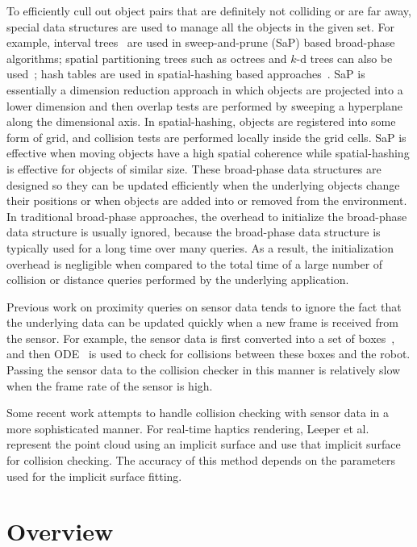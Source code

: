 To efficiently cull out object pairs that are definitely not colliding
or are far away, special data structures are used to manage all
the objects in the given set. For example, interval
trees~\cite{Tracy:2009:ELS} are used in sweep-and-prune (SaP) based broad-phase algorithms; spatial partitioning trees such as octrees and $k$-d
trees can also be used~\cite{Bandi:1995}; hash tables are used in
spatial-hashing based approaches~\cite{Eric2004book}.  SaP is essentially a dimension reduction
approach in which objects are projected into a lower dimension
and then overlap tests are performed by sweeping a hyperplane along the dimensional axis.
In spatial-hashing, objects are registered into some form of grid, and collision tests are performed
locally inside the grid cells. SaP is effective when moving objects have
a high spatial coherence while spatial-hashing is effective for objects of similar size.
These broad-phase data structures are designed so they can be updated efficiently when the
underlying objects change their positions or when objects are added
into or removed from the environment. In traditional broad-phase
approaches, the overhead to initialize the broad-phase data structure
is usually ignored, because the broad-phase data structure is
typically used for a long time over many queries. As a result, the
initialization overhead is negligible when compared to the total time
of a large number of collision or distance queries performed by the
underlying application.

Previous work on proximity queries on sensor data tends to ignore the
fact that the underlying data can be updated quickly when a new frame
is received from the sensor. For example, the
sensor data is first converted into a set of boxes~\cite{Rusu:RPG:2009}, and then ODE~\cite{ODE} is used to check for collisions between these
boxes and the robot. Passing the sensor data to the collision checker
in this manner is relatively slow when the frame rate of the sensor is
high.

Some recent work attempts to handle collision checking with sensor
data in a more sophisticated manner. For real-time haptics rendering,
Leeper et al.~\cite{Leeper:ICRA:2012} represent the point cloud using
an implicit surface and use that implicit surface for collision
checking. The accuracy of this method depends on the parameters used for
the implicit surface fitting.


\section{Overview}
\label{sec:8:overview}

